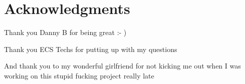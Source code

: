 \chapter*{Acknowledgments}\label{C:ack} 
Thank you Danny B for being great :- ) 

Thank you ECS Techs for putting up with my questions 

And thank you to my wonderful girlfriend for not kicking me out when I was working on this stupid fucking project really late 
